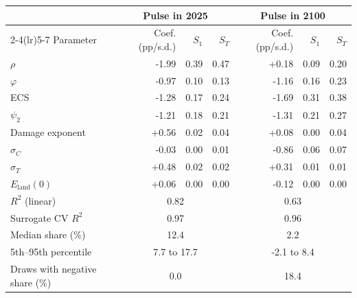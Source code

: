 \begin{tabular}{lrrrrrr}
\toprule
 & \multicolumn{3}{c}{Pulse in 2025} & \multicolumn{3}{c}{Pulse in 2100} \\
\cmidrule(lr){2-4}\cmidrule(lr){5-7}
Parameter & Coef. (pp/s.d.) & $S_1$ & $S_T$ & Coef. (pp/s.d.) & $S_1$ & $S_T$ \\
\midrule
$\rho$ & -1.99 & 0.39 & 0.47 & +0.18 & 0.09 & 0.20 \\
$\varphi$ & -0.97 & 0.10 & 0.13 & -1.16 & 0.16 & 0.23 \\
ECS & -1.28 & 0.17 & 0.24 & -1.69 & 0.31 & 0.38 \\
$\psi_2$ & -1.21 & 0.18 & 0.21 & -1.31 & 0.21 & 0.27 \\
Damage exponent & +0.56 & 0.02 & 0.04 & +0.08 & 0.00 & 0.04 \\
$\sigma_C$ & -0.03 & 0.00 & 0.01 & -0.86 & 0.06 & 0.07 \\
$\sigma_T$ & +0.48 & 0.02 & 0.02 & +0.31 & 0.01 & 0.01 \\
$E_{\mathrm{land}}(0)$ & +0.06 & 0.00 & 0.00 & -0.12 & 0.00 & 0.00 \\
\midrule
$R^2$ (linear) & \multicolumn{3}{c}{0.82} & \multicolumn{3}{c}{0.63} \\
Surrogate CV $R^2$ & \multicolumn{3}{c}{0.97} & \multicolumn{3}{c}{0.96} \\
Median share (\%) & \multicolumn{3}{c}{12.4} & \multicolumn{3}{c}{2.2} \\
5th--95th percentile & \multicolumn{3}{c}{7.7 to 17.7} & \multicolumn{3}{c}{-2.1 to 8.4} \\
Draws with negative share (\%) & \multicolumn{3}{c}{0.0} & \multicolumn{3}{c}{18.4} \\
\bottomrule
\end{tabular}
